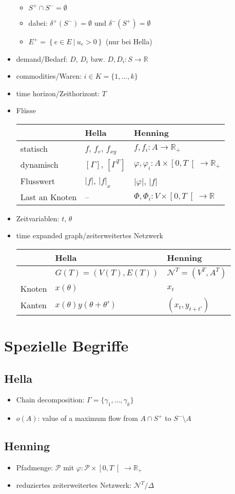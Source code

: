 \documentclass[12pt, a4paper]{article}
\newcommand{\R}{\mathbb{R}}
\newcommand{\ropen}[1]{\ensuremath{\left[#1\right[}}
\newcommand{\func}[3]{\ensuremath{{#1} \colon {#2} \to {#3}}}
\newcommand{\graph}{\mathcal{N}}
\newcommand{\outEdges}{\delta^+}
\newcommand{\inEdges}{\delta^-}
\newcommand{\tExp}[1]{\ensuremath{\graph^{#1}}}
\newcommand{\redNetw}[2]{\tExp{#1}\!/{#2}}
\newcommand{\pathSet}{\mathcal{P}}
\newcommand{\setDef}[2]{\left\{{#1} \:|\: {#2}\right\}}
\begin{document}
\begin{itemize}
\begin{itemize}
	        \item $S^+ \cap S^- = \emptyset$
	        \item dabei: $\outEdges(S^-) = \emptyset$ und $\inEdges(S^+) = \emptyset$
	        \item $E^+ = \setDef{e \in E}{u_e > 0}$ (nur bei Hella)
	    \end{itemize}
    \item demand/Bedarf: $D$, $D_i$ bzw. $\func{D, D_i}{S}{\R}$
    \item commodities/Waren: $i \in K = \{1, \ldots, k\}$
    \item time horizon/Zeithorizont: $T$
    \item Flüsse \\
    	\begin{tabular}{l|l|l}
    		 & Hella & Henning \\ \hline
            statisch & $f$, $f_e$, $f_{xy}$ & $\func{f, f_i}{A}{\R_+}$ \\
    		dynamisch & $\left[ \Gamma \right]$, $\left[ \Gamma^T \right]$
    		            & $\func{\varphi, \varphi_i}{A \times \ropen{0, T}}{\R_+}$ \\
    		Flusswert & $|f|$, $|f|_x$ & $|\varphi|$, $|f|$ \\
    		Last an Knoten & -- & $\func{\Phi, \Phi_i}{V \times \ropen{0, T}}{\R}$
    	\end{tabular}
	\item Zeitvariablen: $t$, $\theta$
	\item time expanded graph/zeiterweitertes Netzwerk\\
    	\begin{tabular}{l|l|l}
    		& Hella & Henning \\ \hline
            & $G(T) = (V(T), E(T))$ & $\tExp{T} = (V^T, A^T)$ \\
            Knoten & $x(\theta)$ & $x_t$ \\
            Kanten & $x(\theta)y(\theta + \theta')$ & $(x_t, y_{t + t'})$
    	\end{tabular}
    
    
\end{itemize}

\section*{Spezielle Begriffe}
\subsection*{Hella}
\begin{itemize}
    \item Chain decomposition: $\Gamma = \{\gamma_1,\ldots,\gamma_k\}$
    \item $o(A)$: value of a maximum flow from $A \cap S^+$ to $S^- \setminus A$
\end{itemize}

\subsection*{Henning}
\begin{itemize}
    \item Pfadmenge: $\pathSet$ mit $\func{\varphi}{\pathSet \times \ropen{0,T}}{\R_+}$
    \item reduziertes zeiterweitertes Netzwerk: $\redNetw{T}{\Delta}$
\end{itemize}
\end{document}
